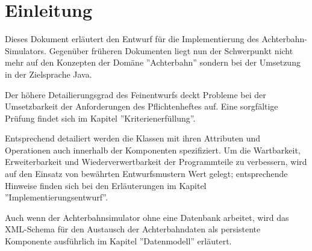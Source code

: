 
\chapter{Einleitung}

Dieses Dokument erläutert den Entwurf für die Implementierung des Achterbahn-Simulators.
Gegenüber früheren Dokumenten liegt nun der Schwerpunkt nicht mehr auf den Konzepten 
der Domäne ''Achterbahn'' sondern bei der Umsetzung in der Zielsprache Java. 

Der höhere Detailierungsgrad des Feinentwurfs deckt Probleme bei der Umsetzbarkeit
der Anforderungen des Pflichtenheftes auf. Eine sorgfältige Prüfung findet sich im 
Kapitel ''Kriterienerfüllung''.

Entsprechend detailiert werden die Klassen mit ihren Attributen und Operationen auch innerhalb der
Komponenten spezifiziert. Um die Wartbarkeit, Erweiterbarkeit und Wiederverwertbarkeit
der Programmteile zu verbessern, wird auf den Einsatz von bewährten Entwurfsmustern
Wert gelegt; entsprechende Hinweise finden sich bei den Erläuterungen im Kapitel 
''Implementierungsentwurf''.

Auch wenn der Achterbahnsimulator ohne eine Datenbank arbeitet, wird das XML-Schema
für den Austausch der Achterbahndaten als persistente Komponente ausführlich 
im Kapitel ''Datenmodell'' erläutert.

